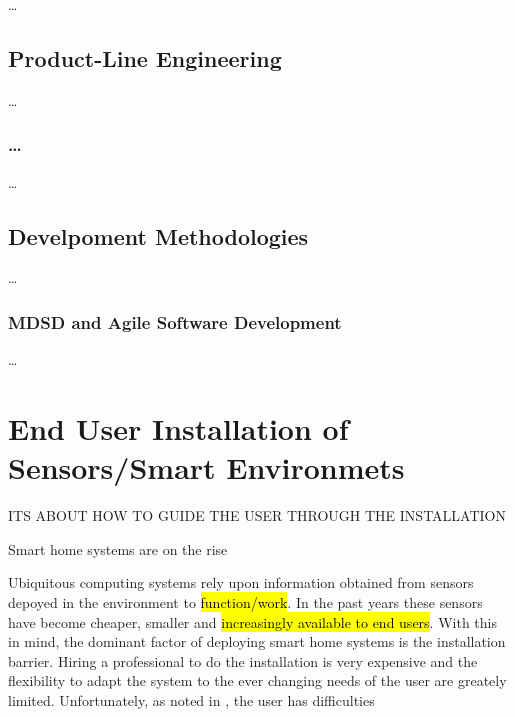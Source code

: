 \dots

\section{Product-Line Engineering}
\label{ch:Content1:sec:Section3}

\dots

\subsection{\ldots}
\label{ch:Content1:sec:Section2:subsec:SubSection1}

\dots

\section{Develpoment Methodologies}
\label{ch:Content1:sec:Section4}

\dots

\subsection{MDSD and Agile Software Development}
\label{ch:Content1:sec:Section4:subsec:SubSection1}

\dots



\chapter{End User Installation of Sensors/Smart Environmets}
\label{ch:Content2}

\huge{} ITS ABOUT HOW TO GUIDE THE USER THROUGH THE INSTALLATION
\normalsize{}

Smart home systems are on the rise

Ubiquitous computing systems rely upon information obtained from sensors depoyed
in the environment to \hl{function/work}. In the past years these sensors have
become cheaper, smaller and \hl{increasingly available to end users}. With this
in mind, the dominant factor of deploying smart home systems is the installation
barrier. Hiring a professional to do the installation is very expensive and the
flexibility to adapt the system to the ever changing needs of the user are
greately limited. Unfortunately, as noted in \cite{Beckmann2004}, the user has
difficulties 

